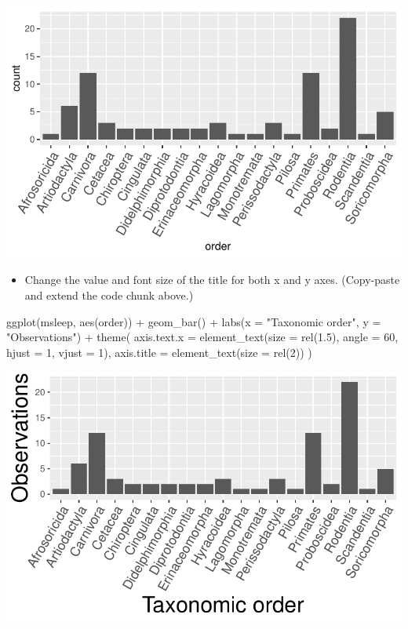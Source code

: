 \documentclass[
  letterpaper,
  DIV=11,
  numbers=noendperiod]{scrartcl}
\newenvironment{Shaded}{\begin{snugshade}}{\end{snugshade}}
\newcommand{\AttributeTok}[1]{\textcolor[rgb]{0.40,0.45,0.13}{#1}}
\newcommand{\DecValTok}[1]{\textcolor[rgb]{0.68,0.00,0.00}{#1}}
\newcommand{\FloatTok}[1]{\textcolor[rgb]{0.68,0.00,0.00}{#1}}
\newcommand{\FunctionTok}[1]{\textcolor[rgb]{0.28,0.35,0.67}{#1}}
\newcommand{\NormalTok}[1]{\textcolor[rgb]{0.00,0.23,0.31}{#1}}
\newcommand{\SpecialCharTok}[1]{\textcolor[rgb]{0.37,0.37,0.37}{#1}}
\newcommand{\StringTok}[1]{\textcolor[rgb]{0.13,0.47,0.30}{#1}}
\providecommand{\tightlist}{%
  \setlength{\itemsep}{0pt}\setlength{\parskip}{0pt}}\usepackage{longtable,booktabs,array}
\begin{document}
\includegraphics{5-ggplot2_kevin_files/figure-pdf/unnamed-chunk-18-1.pdf}

\begin{itemize}
\tightlist
\item
  Change the value and font size of the title for both x and y axes.
  (Copy-paste and extend the code chunk above.)
\end{itemize}

\begin{Shaded}
\begin{Highlighting}[]
\FunctionTok{ggplot}\NormalTok{(msleep, }\FunctionTok{aes}\NormalTok{(order)) }\SpecialCharTok{+}
  \FunctionTok{geom\_bar}\NormalTok{() }\SpecialCharTok{+}
  \FunctionTok{labs}\NormalTok{(}\AttributeTok{x =} \StringTok{"Taxonomic order"}\NormalTok{, }\AttributeTok{y =} \StringTok{"Observations"}\NormalTok{) }\SpecialCharTok{+}
  \FunctionTok{theme}\NormalTok{(}
    \AttributeTok{axis.text.x =} \FunctionTok{element\_text}\NormalTok{(}\AttributeTok{size =} \FunctionTok{rel}\NormalTok{(}\FloatTok{1.5}\NormalTok{), }\AttributeTok{angle =} \DecValTok{60}\NormalTok{, }\AttributeTok{hjust =} \DecValTok{1}\NormalTok{, }\AttributeTok{vjust =} \DecValTok{1}\NormalTok{),}
    \AttributeTok{axis.title =} \FunctionTok{element\_text}\NormalTok{(}\AttributeTok{size =} \FunctionTok{rel}\NormalTok{(}\DecValTok{2}\NormalTok{))}
\NormalTok{    )}
\end{Highlighting}
\end{Shaded}

\includegraphics{5-ggplot2_kevin_files/figure-pdf/unnamed-chunk-19-1.pdf}
\end{document}
